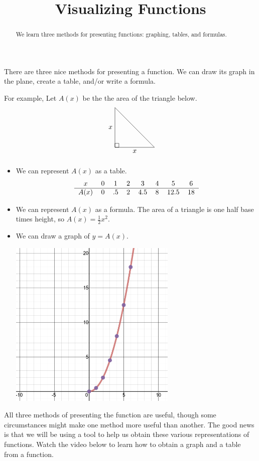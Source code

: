 \documentclass{ximera}
\title{Visualizing Functions}
\begin{document}
\begin{abstract}
We learn three methods for presenting functions: graphing, tables, and formulas.
\end{abstract}
\maketitle

There are three nice methods for presenting a function. We can draw its graph in the plane, create a table, and/or write a formula.

For example, Let $A(x)$ be the the area of the triangle below.
\[
\begin{tikzpicture}
\draw (0,0) --node[below]{$x$} (2,0) -- (0,2) --node[left]{$x$} (0,0) rectangle (.2,.2);
\end{tikzpicture}
\]
\begin{itemize}
\item We can represent $A(x)$ as a table.
\[
\begin{tabular}{cccccccc}
$x$ & $0$ & $1$ & $2$ & $3$ & $4$ & $5$ & $6$\\ \hline
$A(x)$ & $0$ & $.5$ & $2$ & $4.5$ & $8$ & $12.5$ & $18$
\end{tabular}
\]
\item
We can represent $A(x)$ as a formula. The area of a triangle is one half base times height, so $A(x)=\frac{1}{2}x^2$.
\item We can draw a graph of $y=A(x)$.
\begin{image}
\includegraphics[width=8cm]{TriangleArea.png}
\end{image}
\end{itemize}

All three methods of presenting the function are useful, though some circumstances might make one method more useful than another. The good news is that we will be using a tool to help us obtain these various representations of functions. Watch the video below to learn how to obtain a graph and a table from a function.
\end{document}
